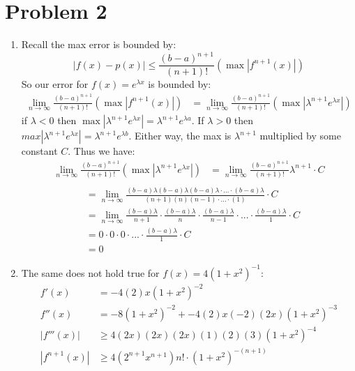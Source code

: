 \documentclass{article}
\begin{document}
\section*{Problem 2}
\begin{enumerate}
\item 
Recall the max error is bounded by: \\
\[
|f(x) - p(x)| \leq \frac{(b-a)^{n+1}}{(n+1)!}(\max |f^{n+1}(x)|)
\]
So our error for $f(x) = e^{\lambda x}$ is bounded by: \\
\begin{align*}
\lim_{n \rightarrow \infty}\frac{(b-a)^{n+1}}{(n+1)!}(\max |f^{n+1}(x)|) &= \lim_{n \rightarrow \infty}\frac{(b-a)^{n+1}}{(n+1)!}(\max |\lambda^{n+1}e^{\lambda x}|)
\end{align*}
if $\lambda <0$ then $\max |\lambda^{n+1}e^{\lambda x}| = \lambda ^ {n+1}e^{\lambda a}$. If $\lambda > 0$ then  $max |\lambda^{n+1}e^{\lambda x}| = \lambda ^ {n+1}e^{\lambda b}$. Either way, the max is $\lambda^{n+1}$ multiplied by some constant $C$. Thus we have:\\
\begin{align*}
\lim_{n \rightarrow \infty}\frac{(b-a)^{n+1}}{(n+1)!}(\max |\lambda^{n+1}e^{\lambda x}|) &= \lim_{n \rightarrow \infty}\frac{(b-a)^{n+1}}{(n+1)!}\lambda^{n+1} \cdot C\\
\end{align*}
\begin{align*}
&= \lim_{n \rightarrow \infty}\frac{(b-a)\lambda(b-a)\lambda(b-a)\lambda \cdot ... \cdot (b-a)\lambda}{(n+1)(n)(n-1) \cdot ... \cdot (1)}\cdot C\\
&=  \lim_{n \rightarrow \infty}\frac{(b-a)\lambda}{n+1} \cdot \frac{(b-a)\lambda}{n} \cdot \frac{(b-a) \lambda}{n-1} \cdot ... \cdot \frac{(b-a)\lambda}{1} \cdot C\\
&= 0 \cdot 0 \cdot 0 \cdot ... \cdot \frac{(b-a)\lambda}{1} \cdot C\\
&= 0
\end{align*}
\item The same does not hold true for $f(x) = 4(1+x^2)^{-1}$:\\
\begin{align*}
f'(x) &= -4(2)x(1+x^2)^{-2} \\
f''(x) &= -8(1+x^2)^{-2} + -4(2)x(-2)(2x)(1 + x^2)^{-3} \\
|f'''(x)| &\geq 4(2x)(2x)(2x)(1)(2)(3)(1+x^2)^{-4}\\
|f^{n+1}(x)| &\geq 4(2^{n+1}x^{n+1})n! \cdot (1 + x^2)^{-(n+1)}
\end{align*}

\end{enumerate}
\end{document}
